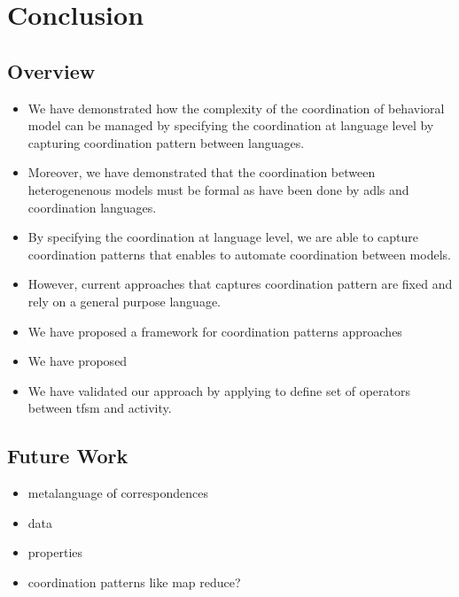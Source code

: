 \chapter{Conclusion}
\label{ch:conclusions}

\section{Overview}

\begin{itemize}

	\item We have demonstrated how the complexity of the coordination of behavioral model can be managed by specifying the coordination at language level \ie by capturing coordination pattern between languages.
	
	\item Moreover, we have demonstrated that the coordination between heterogenenous models must be formal as have been done by adls and coordination languages. 
	
	\item By specifying the coordination at language level, we are able to capture coordination patterns that enables to automate coordination between models. 
	
	\item However, current approaches that captures coordination pattern are fixed and rely on a general purpose language. 
	
	
	\item We have proposed a framework for coordination patterns approaches
	
	\item We have proposed \bcool 
	
	\item We have validated our approach by applying \bcool to define set of operators between tfsm and activity.  

	
\end{itemize}
\section{Future Work}
\begin{itemize}
	\item metalanguage of correspondences
	\item data
	\item properties 
	\item coordination patterns like map reduce? 
\end{itemize}
